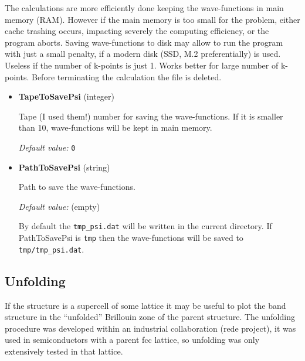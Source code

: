 \documentclass[11pt]{article}
\begin{document}
The calculations are more efficiently done keeping the wave-functions in main memory (RAM).
However if the main memory is too small for the problem, either cache trashing occurs,
impacting severely the computing efficiency, or the program aborts.
Saving wave-functions to disk may allow to run the program with just a small penalty,
if a modern disk (SSD, M.2 preferentially) is used.
Useless if the number of k-points is just 1.  Works better for large number of k-points.
Before terminating the calculation the file is deleted.


\begin{itemize}

\item{\bf TapeToSavePsi} (integer)

  Tape (I used them!) number for saving the wave-functions.  If it is smaller than 10,
  wave-functions will be kept in main memory.

  \textit{Default value:}  \texttt{0}

\item{\bf PathToSavePsi} (string)

  Path to save the wave-functions.

  \textit{Default value:}  (empty)

  By default the \texttt{tmp{\_}psi.dat} will be written in the current directory.
  If PathToSavePsi is \texttt{tmp} then the wave-functions will be saved to
  \texttt{tmp/tmp{\_}psi.dat}.


\end{itemize}


\subsection{Unfolding}

If the structure is a supercell of some lattice it may be useful to plot the band structure
in the ``unfolded'' Brillouin zone of the parent structure.
The unfolding procedure was developed within an industrial collaboration (rede project),
it was used in semiconductors with a parent fcc lattice,
so unfolding was only extensively tested in that lattice.
\end{document}
